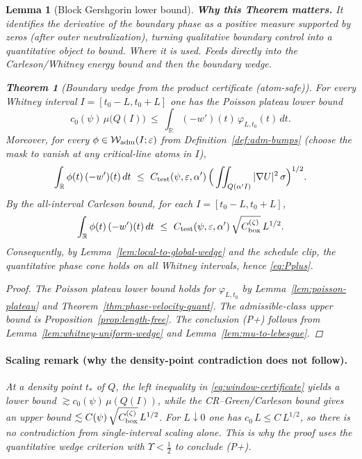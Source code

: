 \documentclass[11pt]{article}
\newtheorem{theorem}{Theorem}[section]
\newtheorem{lemma}{Lemma}[section]
\theoremstyle{definition}
\theoremstyle{remark}
\newcommand{\R}{\mathbb{R}}
\begin{document}
\begin{lemma}[Block Gershgorin lower bound]
\vspace{1.0cm}
\noindent\textbf{Why this Theorem matters.} It identifies the derivative of the boundary phase as a positive measure supported by zeros (after outer neutralization), turning qualitative boundary control into a quantitative object to bound.
\noindent\textit{Where it is used.} Feeds directly into the Carleson/Whitney energy bound and then the boundary wedge.
\begin{theorem}[Boundary wedge from the product certificate (atom-safe)]\label{thm:psc-certificate-stage2}
For every Whitney interval $I=[t_0-L,t_0+L]$ one has the Poisson plateau lower bound
\[
  c_0(\psi)\,\mu\!\big(Q(I)\big)\ \le\ \int_{\R} (-w')(t)\,\varphi_{L,t_0}(t)\,dt.
\tag{\*}\label{eq:window-certificate}
\]
Moreover, for every $\phi\in\mathcal W_{\rm adm}(I;\varepsilon)$ from Definition~\ref{def:adm-bumps} (choose the mask to vanish at any critical-line atoms in $I$),
\[
  \int_{\R} \phi(t)\,(-w')(t)\,dt\ \le\ C_{\rm test}(\psi,\varepsilon,\alpha')\,\Big(\iint_{Q(\alpha'I)} |\nabla U|^2\,\sigma\Big)^{1/2}.
\]
By the all-interval Carleson bound, for each $I=[t_0-L,t_0+L]$,
\[
  \int_{\R} \phi(t)\,(-w')(t)\,dt\ \le\ C_{\rm test}(\psi,\varepsilon,\alpha')\,\sqrt{C_{\rm box}^{(\zeta)}}\,L^{1/2}.
\]
Consequently, by Lemma~\ref{lem:local-to-global-wedge} and the schedule clip, the quantitative phase cone holds on all Whitney intervals, hence \eqref{eq:Pplus}.
\end{theorem}
\begin{proof}
The Poisson plateau lower bound holds for $\varphi_{L,t_0}$ by Lemma~\ref{lem:poisson-plateau} and Theorem~\ref{thm:phase-velocity-quant}. The admissible-class upper bound is Proposition~\ref{prop:length-free}. The conclusion \textup{(P+)} follows from Lemma~\ref{lem:whitney-uniform-wedge} and Lemma~\ref{lem:mu-to-lebesgue}.
\end{proof}







\vspace{1.0cm}
\paragraph{Scaling remark (why the density-point contradiction does not follow).}
At a density point $t_*$ of $Q$, the left inequality in \eqref{eq:window-certificate} yields a lower bound $\gtrsim c_0(\psi)\,\mu(Q(I))$, while the CR–Green/Carleson bound gives an upper bound $\lesssim C(\psi)\,\sqrt{C_{\rm box}^{(\zeta)}}\,L^{1/2}$. For $L\downarrow 0$ one has $c_0\,L\le C\,L^{1/2}$, so there is no contradiction from single-interval scaling alone. This is why the proof uses the quantitative wedge criterion with $\Upsilon<\tfrac12$ to conclude (P+).


\end{lemma}
\end{document}
